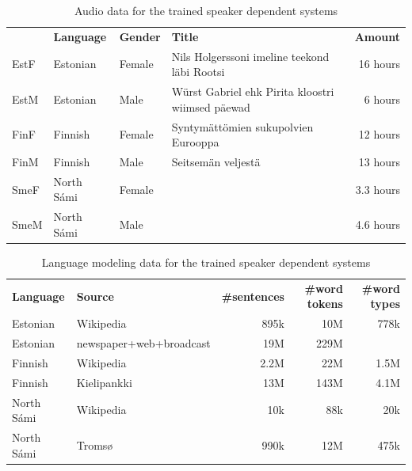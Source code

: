 \documentclass[b5paper]{article}
\newcommand{\ns}{{North Sámi }}
\begin{document}
\begin{table}[h!]

\begin{tabular}{llllr}
 & \textbf{Language} & \textbf{Gender} & \textbf{Title} & \textbf{Amount}\\
EstF & Estonian & Female &Nils Holgerssoni imeline teekond läbi Rootsi  & 16 hours \\
EstM & Estonian & Male & Würst Gabriel ehk Pirita kloostri wiimsed päewad & 6 hours \\
FinF & Finnish & Female & Syntymättömien sukupolvien Eurooppa & 12 hours\\
FinM & Finnish & Male & Seitsemän veljestä & 13 hours\\
SmeF & \ns & Female & & 3.3 hours  \\
SmeM & \ns & Male & & 4.6 hours \\
\end{tabular}
\caption{Audio data for the trained speaker dependent systems\label{tbl:amdatacomp}}
\end{table}

\begin{table}[h!]

\centering
\begin{tabular}{llrrr}
\textbf{Language} & \textbf{Source} & \textbf{\#sentences} & \textbf{ \#word tokens} & \textbf{\#word types}\\
Estonian & Wikipedia &  895k & 10M & 778k \\
 Estonian & newspaper+web+broadcast & 19M  & 229M  & \\
 Finnish & Wikipedia &  2.2M  & 22M & 1.5M \\
 Finnish & Kielipankki & 13M &  143M & 4.1M \\
 \ns & Wikipedia & 10k & 88k & 20k\\
 \ns & Tromsø & 990k & 12M & 475k\\
\end{tabular}
\caption{Language modeling data for the trained speaker dependent systems\label{tbl:lmdatacomp}}
\end{table}
\end{document}
